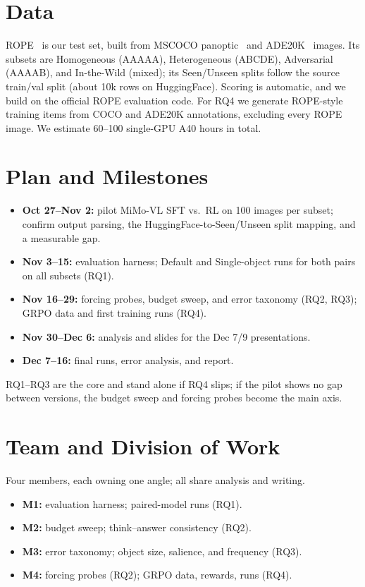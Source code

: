 \documentclass[11pt]{article}
\begin{document}
\section{Data}

ROPE~\citep{chen2024rope} is our test set, built from MSCOCO panoptic~\citep{lin2014coco} and ADE20K~\citep{zhou2019ade20k} images. Its subsets are Homogeneous (AAAAA), Heterogeneous (ABCDE), Adversarial (AAAAB), and In-the-Wild (mixed); its Seen/Unseen splits follow the source train/val split (about 10k rows on HuggingFace). Scoring is automatic, and we build on the official ROPE evaluation code. For RQ4 we generate ROPE-style training items from COCO and ADE20K annotations, excluding every ROPE image. We estimate 60--100 single-GPU A40 hours in total.

\section{Plan and Milestones}

\begin{itemize}
\item \textbf{Oct 27--Nov 2:} pilot MiMo-VL SFT vs.\ RL on 100 images per subset; confirm output parsing, the HuggingFace-to-Seen/Unseen split mapping, and a measurable gap.
\item \textbf{Nov 3--15:} evaluation harness; Default and Single-object runs for both pairs on all subsets (RQ1).
\item \textbf{Nov 16--29:} forcing probes, budget sweep, and error taxonomy (RQ2, RQ3); GRPO data and first training runs (RQ4).
\item \textbf{Nov 30--Dec 6:} analysis and slides for the Dec 7/9 presentations.
\item \textbf{Dec 7--16:} final runs, error analysis, and report.
\end{itemize}

\noindent RQ1--RQ3 are the core and stand alone if RQ4 slips; if the pilot shows no gap between versions, the budget sweep and forcing probes become the main axis.

\section{Team and Division of Work}

Four members, each owning one angle; all share analysis and writing.
\begin{itemize}
\item \textbf{M1:} evaluation harness; paired-model runs (RQ1).
\item \textbf{M2:} budget sweep; think--answer consistency (RQ2).
\item \textbf{M3:} error taxonomy; object size, salience, and frequency (RQ3).
\item \textbf{M4:} forcing probes (RQ2); GRPO data, rewards, runs (RQ4).
\end{itemize}


\end{document}
